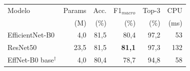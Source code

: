 \begin{tabular}{lrrrrr}
\hline
Modelo & Params & Acc. & F1$_{macro}$ & Top-3 & CPU \\
 & (M) & (\%) & (\%) & (\%) & (ms) \\
\hline
EfficientNet-B0 & 4,0 & 81,5 & 80,4 & 97,2 & 53 \\
ResNet50 & 23,5 & 81,5 & \textbf{81,1} & 97,3 & 132 \\
EffNet-B0 base$^{\dagger}$ & 4,0 & 80,4 & 78,7 & 94,8 & 58 \\
\hline
\end{tabular}
